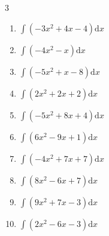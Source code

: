 \begin{multicols}{3}
\begin{enumerate}
\columnbreak %

  \item $\displaystyle \int \left( -3x^{2}+4x-4 \right) \mathrm{d}x$


  \item $\displaystyle \int \left( -4x^{2}-x \right) \mathrm{d}x$


  \item $\displaystyle \int \left( -5x^{2}+x-8 \right) \mathrm{d}x$


  \item $\displaystyle \int \left( 2x^{2}+2x+2 \right) \mathrm{d}x$


  \item $\displaystyle \int \left( -5x^{2}+8x+4 \right) \mathrm{d}x$


  \item $\displaystyle \int \left( 6x^{2}-9x+1 \right) \mathrm{d}x$


  \item $\displaystyle \int \left( -4x^{2}+7x+7 \right) \mathrm{d}x$


  \item $\displaystyle \int \left( 8x^{2}-6x+7 \right) \mathrm{d}x$


  \item $\displaystyle \int \left( 9x^{2}+7x-3 \right) \mathrm{d}x$


  \item $\displaystyle \int \left( 2x^{2}-6x-3 \right) \mathrm{d}x$



\end{enumerate}
\end{multicols}
